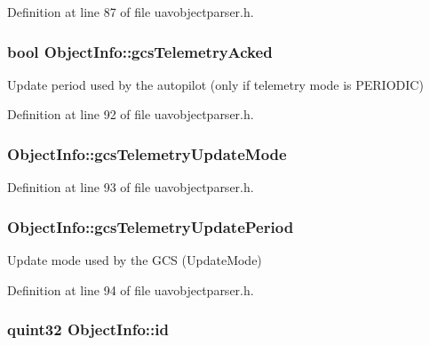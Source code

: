 Definition at line 87 of file uavobjectparser.\-h.

\hypertarget{struct_object_info_aa24c62cec1226eb0b3aa40601db8a06e}{
\subsubsection[{gcs\-Telemetry\-Acked}]{\setlength{\rightskip}{0pt plus 5cm}bool Object\-Info\-::gcs\-Telemetry\-Acked}}\label{struct_object_info_aa24c62cec1226eb0b3aa40601db8a06e}
Update period used by the autopilot (only if telemetry mode is P\-E\-R\-I\-O\-D\-I\-C) 

Definition at line 92 of file uavobjectparser.\-h.

\hypertarget{struct_object_info_a62c810f99f09ed18bcb16eb2c564197f}{
\subsubsection[{gcs\-Telemetry\-Update\-Mode}]{ Object\-Info\-::gcs\-Telemetry\-Update\-Mode}}\label{struct_object_info_a62c810f99f09ed18bcb16eb2c564197f}


Definition at line 93 of file uavobjectparser.\-h.

\hypertarget{struct_object_info_a01aada7cce704710f0c296f60bcb4424}{
\subsubsection[{gcs\-Telemetry\-Update\-Period}]{ Object\-Info\-::gcs\-Telemetry\-Update\-Period}}\label{struct_object_info_a01aada7cce704710f0c296f60bcb4424}
Update mode used by the G\-C\-S (Update\-Mode) 

Definition at line 94 of file uavobjectparser.\-h.

\hypertarget{struct_object_info_aa7808d8103bc4df38ccf7d14d5d9e379}{
\subsubsection[{id}]{\setlength{\rightskip}{0pt plus 5cm}quint32 Object\-Info\-::id}}\label{struct_object_info_aa7808d8103bc4df38ccf7d14d5d9e379}


